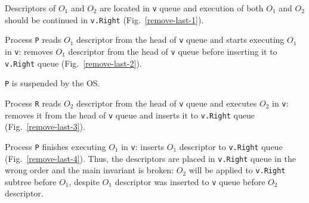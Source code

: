 \documentclass[times, dvipsnames,%
               languages={russian,english} %
              ]{itmo-student-thesis}
\begin{document}
\begin{nenum}
    \item Descriptors of $O_1$ and $O_2$ are located in \texttt{v} queue and execution of both $O_1$ and $O_2$ should be continued in \texttt{v.Right} (Fig.~\ref{remove-last-1}).
    
    \item Process \texttt{P} reads $O_1$ descriptor from the head of \texttt{v} queue and starts executing $O_1$ in \texttt{v}: removes $O_1$ descriptor from the head of \texttt{v} queue before inserting it to \texttt{v.Right} queue (Fig.~\ref{remove-last-2}).
    
    \item \texttt{P} is suspended by the OS.
    
    \item Process \texttt{R} reads $O_2$ descriptor from the head of \texttt{v} queue and executes $O_2$ in \texttt{v}: removes it from the head of \texttt{v} queue and inserts it to \texttt{v.Right} queue (Fig.~\ref{remove-last-3}). 
    
    \item Process \texttt{P} finishes executing $O_1$ in \texttt{v}: inserts $O_1$ descriptor to \texttt{v.Right} queue (Fig.~\ref{remove-last-4}). Thus, the descriptors are placed in \texttt{v.Right} queue in the wrong order and the main invariant is broken: $O_2$ will be applied to \texttt{v.Right} subtree before $O_1$, despite $O_1$ descriptor was inserted to \texttt{v} queue before $O_2$ descriptor.
\end{nenum}
\end{document}
